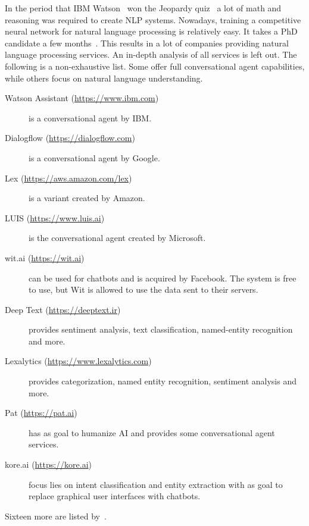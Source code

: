 In the period that IBM Watson~\citep{ibm2019assistant} won the Jeopardy quiz~\citep{high2012era} a lot of math and reasoning was required to create NLP systems.
Nowadays, training a competitive neural network for natural language processing is relatively easy.
It takes a PhD candidate a few months~\citep{manning2017lectures}.
This results in a lot of companies providing natural language processing services.
An in-depth analysis of all services is left out.
The following is a non-exhaustive list.
Some offer full conversational agent capabilities, while others focus on natural language understanding.
\begin{description}
    \item [Watson Assistant (\url{https://www.ibm.com})] is a conversational agent by IBM.
    \item [Dialogflow (\url{https://dialogflow.com})] is a conversational agent by Google.
    \item [Lex (\url{https://aws.amazon.com/lex})] is a variant created by Amazon.
    \item [LUIS (\url{https://www.luis.ai})] is the conversational agent created by Microsoft.
    \item [wit.ai (\url{https://wit.ai})] can be used for chatbots and is acquired by Facebook.
    The system is free to use, but Wit is allowed to use the data sent to their servers.
    \item [Deep Text (\url{https://deeptext.ir})] provides sentiment analysis, text classification, named-entity recognition and more.
    \item [Lexalytics (\url{https://www.lexalytics.com})] provides categorization, named entity recognition, sentiment analysis and more.
    \item [Pat (\url{https://pat.ai})] has as goal to humanize AI and provides some conversational agent services.
    \item [kore.ai (\url{https://kore.ai})] focus lies on intent classification and entity extraction with as goal to replace graphical user interfaces with chatbots.
\end{description}
Sixteen more are listed by~\citet{dale2018text}.
